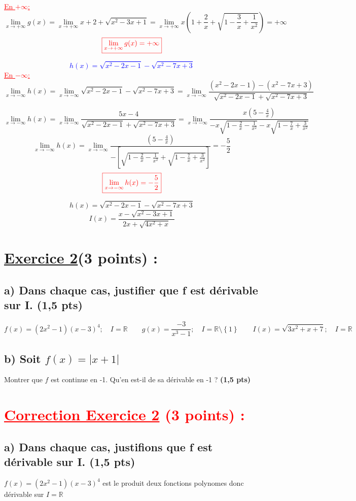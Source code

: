 \documentclass[12pt]{article}
\begin{document}
\textcolor{red}{\underline{En $+\infty$:}}
\[\lim_{x \to +\infty}g(x)=\lim_{x \to +\infty}x+2+\sqrt{x^{2}-3x+1}=\lim_{x \to +\infty}x\left(1+\frac{2}{x}+\sqrt{1-\frac{3}{x}+\frac{1}{x^{2}}}\right)=+\infty\] 
\[\textcolor{red}{\boxed{\lim_{x \to +\infty}g(x)=+\infty}}\]

\textcolor{blue}{\[h(x)=\sqrt{x^{2}-2x-1}-\sqrt{x^{2}-7x+3}\]}
\textcolor{red}{\underline{En $-\infty$:}}
\[\lim_{x \to -\infty}h(x)=\lim_{x \to -\infty}\sqrt{x^{2}-2x-1}-\sqrt{x^{2}-7x+3}=\lim_{x \to -\infty}\frac{\left( x^{2}-2x-1\right) -\left( x^{2}-7x+3\right)}{\sqrt{x^{2}-2x-1}+\sqrt{x^{2}-7x+3}}\]
 
\[\lim_{x \to -\infty}h(x)=\lim_{x \to -\infty}\frac{5x-4}{\sqrt{x^{2}-2x-1}+\sqrt{x^{2}-7x+3}}=\lim_{x \to -\infty}\frac{x(5-\frac{4}{x})}{-x\sqrt{1-\frac{2}{x}-\frac{1}{x^{2}}}-x\sqrt{1-\frac{7}{x}+\frac{3}{x^{2}}}}\]
\[\lim_{x \to -\infty}h(x)=\lim_{x \to -\infty}\frac{(5-\frac{4}{x})}{-\left[\sqrt{1-\frac{2}{x}-\frac{1}{x^{2}}}+\sqrt{1-\frac{7}{x}+\frac{3}{x^{2}}}\right]}=-\frac{5}{2}\] 
\[\textcolor{red}{\boxed{\lim_{x \to -\infty}h(x)=-\frac{5}{2}}}\]

\[h(x)=\sqrt{x^{2}-2x-1}-\sqrt{x^{2}-7x+3} \]
\[I(x)=\frac{x-\sqrt{x^{2}-3x+1}}{2x+\sqrt{4x^{2}+x}} \]
\section*{\underline{Exercice 2}(3 points) :}
\subsection*{a) Dans chaque cas, justifier que f est dérivable sur I. (1,5 pts)}
\[f(x)=(2x^{2}-1)(x-3)^{4};\quad I=\mathbb{R}\quad\quad g(x)=\frac{-3}{x^{3}-1};\quad I=\mathbb{R}\setminus\left\lbrace 1 \right\rbrace \quad\quad I(x)=\sqrt{3x^{2}+x+7};\quad I=\mathbb{R}\]
\subsection*{b) Soit $f(x)=|x+1|$ }
Montrer que $f$ est continue en -1. Qu'en est-il de sa dérivable en -1 ? \textbf{(1,5 pts)}
\section*{\textcolor{red}{\underline{Correction Exercice 2} (3 points) :}}
\subsection*{a) Dans chaque cas, justifions que f est dérivable sur I. (1,5 pts)}
$f(x)=(2x^{2}-1)(x-3)^{4}$ est le produit deux fonctions polynomes donc dérivable sur $I=\mathbb{R}$
\end{document}
